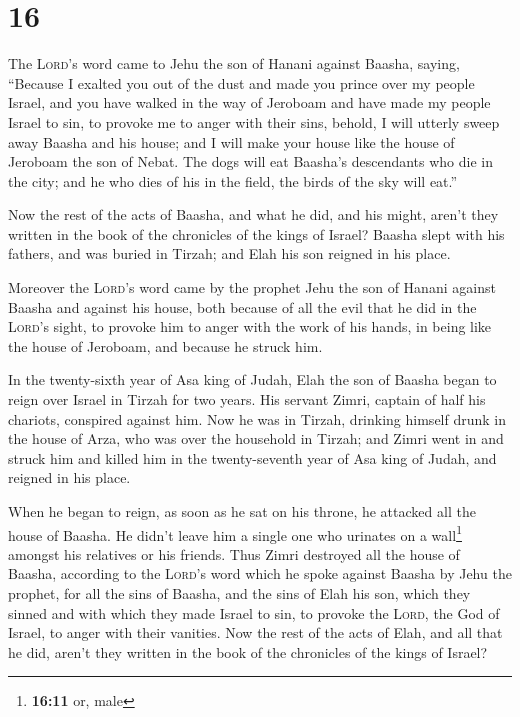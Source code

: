 \hypertarget{section-15}{%
\section{16}\label{section-15}}

 The \textsc{Lord}'s word came to Jehu the son of Hanani
against Baasha, saying,  ``Because I exalted you out of
the dust and made you prince over my people Israel, and you have walked
in the way of Jeroboam and have made my people Israel to sin, to provoke
me to anger with their sins,  behold, I will utterly sweep
away Baasha and his house; and I will make your house like the house of
Jeroboam the son of Nebat.  The dogs will eat Baasha's
descendants who die in the city; and he who dies of his in the field,
the birds of the sky will eat.''

 Now the rest of the acts of Baasha, and what he did, and
his might, aren't they written in the book of the chronicles of the
kings of Israel?  Baasha slept with his fathers, and was
buried in Tirzah; and Elah his son reigned in his place.

 Moreover the \textsc{Lord}'s word came by the prophet
Jehu the son of Hanani against Baasha and against his house, both
because of all the evil that he did in the \textsc{Lord}'s sight, to
provoke him to anger with the work of his hands, in being like the house
of Jeroboam, and because he struck him.

 In the twenty-sixth year of Asa king of Judah, Elah the
son of Baasha began to reign over Israel in Tirzah for two years.
 His servant Zimri, captain of half his chariots,
conspired against him. Now he was in Tirzah, drinking himself drunk in
the house of Arza, who was over the household in Tirzah; 
and Zimri went in and struck him and killed him in the twenty-seventh
year of Asa king of Judah, and reigned in his place.

 When he began to reign, as soon as he sat on his throne,
he attacked all the house of Baasha. He didn't leave him a single one
who urinates on a wall\footnote{\textbf{16:11} or, male} amongst his
relatives or his friends.  Thus Zimri destroyed all the
house of Baasha, according to the \textsc{Lord}'s word which he spoke
against Baasha by Jehu the prophet,  for all the sins of
Baasha, and the sins of Elah his son, which they sinned and with which
they made Israel to sin, to provoke the \textsc{Lord}, the God of
Israel, to anger with their vanities.  Now the rest of
the acts of Elah, and all that he did, aren't they written in the book
of the chronicles of the kings of Israel?

